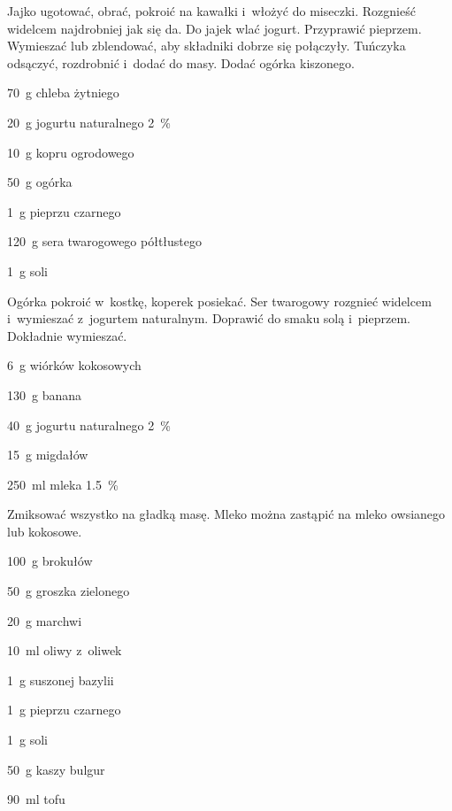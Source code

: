 \documentclass[../kucharek.tex]{subfiles}
\begin{document}
Jajko ugotować, obrać, pokroić na kawałki i~włożyć do miseczki. Rozgnieść
widelcem najdrobniej jak się da. Do jajek wlać jogurt. Przyprawić pieprzem.
Wymieszać lub zblendować, aby składniki dobrze się połączyły. Tuńczyka
odsączyć, rozdrobnić i~dodać do masy. Dodać ogórka kiszonego.


\begin{Ingred}
    \item \qty{70}{\gram} chleba żytniego
    \item \qty{20}{\gram} jogurtu naturalnego \qty{2}{\percent}
    \item \qty{10}{\gram} kopru ogrodowego
    \item \qty{50}{\gram} ogórka
    \item \qty{1}{\gram} pieprzu czarnego
    \item \qty{120}{\gram} sera twarogowego półtłustego
    \item \qty{1}{\gram} soli
\end{Ingred}

Ogórka pokroić w~kostkę, koperek posiekać. Ser twarogowy rozgnieć widelcem
i~wymieszać z~jogurtem naturalnym. Doprawić do smaku solą i~pieprzem. Dokładnie
wymieszać.


\begin{Ingred}
    \item \qty{6}{\gram} wiórków kokosowych
    \item \qty{130}{\gram} banana
    \item \qty{40}{\gram} jogurtu naturalnego \qty{2}{\percent}
    \item \qty{15}{\gram} migdałów
    \item \qty{250}{\milli\litre} mleka \qty{1.5}{\percent}
\end{Ingred}

Zmiksować wszystko na gładką masę. Mleko można zastąpić na mleko owsianego lub
kokosowe.


\begin{Ingred}
    \item \qty{100}{\gram} brokułów
    \item \qty{50}{\gram} groszka zielonego
    \item \qty{20}{\gram} marchwi
    \item \qty{10}{\milli\litre} oliwy z~oliwek
    \item \qty{1}{\gram} suszonej bazylii
    \item \qty{1}{\gram} pieprzu czarnego
    \item \qty{1}{\gram} soli
    \item \qty{50}{\gram} kaszy bulgur
    \item \qty{90}{\milli\litre} tofu
\end{Ingred}
\end{document}
